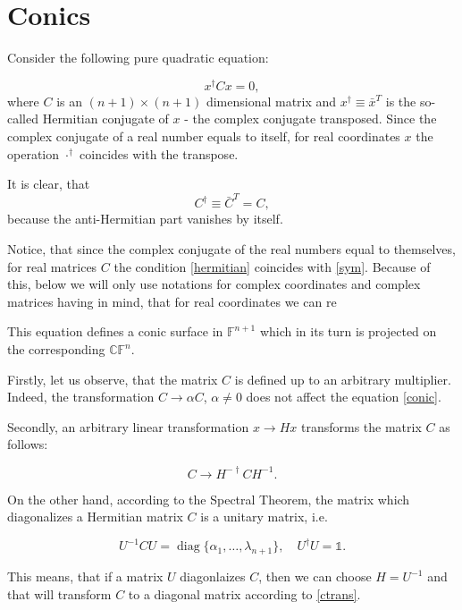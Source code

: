 \documentclass[a4paper,10pt]{article}
\newcommand{\diag}{\mathop{\mathrm{diag}}}
\begin{document}
\section{Conics}

Consider the following  pure quadratic equation:

\begin{equation}
 x^\dag C x = 0,\label{conic}
\end{equation}
where  $C$ is an $(n+1) \times (n+1)$ dimensional matrix and $x^\dag \equiv {\bar x}^T$ is the so-called Hermitian conjugate of $x$ - the complex conjugate transposed. Since the complex conjugate of a real number equals to itself,  for real coordinates $x$ the operation $\cdot^\dag$ coincides with the transpose. 

It is clear, that 
\begin{equation}
 C^\dag\equiv {\bar C}^T= C,\label{hermitian}
\end{equation}
because the anti-Hermitian part vanishes by itself. 

Notice, that since the complex conjugate of the real numbers equal to themselves, for real matrices $C$ the condition \eqref{hermitian} coincides with \eqref{sym}. Because of this,  below we will only use notations for complex coordinates and complex matrices having in mind, that for real coordinates we can re


This equation defines a conic surface in $\mathbb{F}^{n+1}$ which in its turn is projected on the corresponding $\mathbb{CF}^n$. 

Firstly, let us observe, that the matrix $C$ is defined up to an arbitrary multiplier. Indeed, the transformation $C\to \alpha C$, $\alpha\neq 0$ does not affect the equation \eqref{conic}.

Secondly, an arbitrary linear transformation $x \to H x$ transforms the matrix $C$ as follows:

\begin{equation}
 C \to H^{-\dag} C H^{-1}.\label{ctrans}
\end{equation}

On the other hand, according to the Spectral Theorem, the matrix which diagonalizes a Hermitian matrix $C$ is a unitary matrix, i.e. 

\begin{equation}
 U^{-1} C U = \diag\{\alpha_1,\ldots, \lambda_{n+1}\},\quad  U^\dag U = \mathbb{1}.
\end{equation}

This means, that if a matrix $U$ diagonlaizes $C$, then we can choose $H=U^{-1}$ and that will transform $C$ to a diagonal matrix according to \eqref{ctrans}. 
\end{document}
